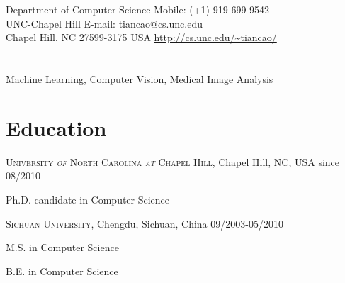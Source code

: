 \documentclass[line,margin]{res}
\newenvironment{list1}{
  \begin{list}{\ding{113}}{%
      \setlength{\itemsep}{0in}
      \setlength{\parsep}{0in} \setlength{\parskip}{0in}
      \setlength{\topsep}{0in} \setlength{\partopsep}{0in} 
      \setlength{\leftmargin}{0.17in}}}{\end{list}}
\begin{document}

\begin{resume}
\section{}
\smallskip
Department of Computer Science  \hfill { Mobile:}  (+1) 919-699-9542 \\
UNC-Chapel Hill \hfill { E-mail:}  tiancao@cs.unc.edu \\
Chapel Hill, NC 27599-3175 USA \hfill  \url{http://cs.unc.edu/~tiancao/} 

\section{}       
\smallskip

Machine Learning, Computer Vision, Medical Image Analysis

\section{\sc Education}
\smallskip

\textsc{University \textit{of} North Carolina \textit{at} Chapel Hill}, Chapel Hill, NC, USA \hfill{since 08/2010}\\
\vspace*{-.15in}
\begin{list1}
\item[] Ph.D. candidate in Computer Science %
\end{list1}
 \vspace*{-.15in}
\textsc{Sichuan University}, Chengdu, Sichuan, China \hfill {09/2003-05/2010}\\
\vspace*{-.15in}
\begin{list1}
\item[] M.S. in Computer Science  %
 \item[]  B.E. in Computer Science  %
\end{list1}


\end{resume}
\end{document}
